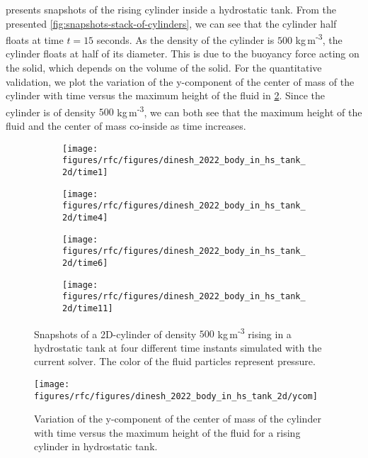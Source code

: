  presents snapshots of the rising
cylinder inside a hydrostatic tank. From the presented
\cref{fig:snapshots-stack-of-cylinders}, we can see that the cylinder half
floats at time $t = 15$ seconds. As the density of the cylinder is $500$
kg\,m\textsuperscript{-3}, the cylinder floats at half of its diameter. This is due
to the buoyancy force acting on the solid, which depends on the volume of the
solid. For the quantitative validation, we plot the variation of the y-component of
the center of mass of the cylinder with time versus the maximum height of the
fluid in \cref{fig:raising-falling-solid-in-water}. Since the cylinder is of
density $500$ kg\,m\textsuperscript{-3}, we can both see that the maximum height of the fluid
and the center of mass co-inside as time increases.
\begin{figure}[!htpb]
  \centering
  \begin{subfigure}{0.48\textwidth}
    \centering
    \texttt{[image: figures/rfc/figures/dinesh\_2022\_body\_in\_hs\_tank\_2d/time1]}
  \end{subfigure}
  \begin{subfigure}{0.48\textwidth}
    \centering
    \texttt{[image: figures/rfc/figures/dinesh\_2022\_body\_in\_hs\_tank\_2d/time4]}
  \end{subfigure}

  \begin{subfigure}{0.48\textwidth}
    \centering
    \texttt{[image: figures/rfc/figures/dinesh\_2022\_body\_in\_hs\_tank\_2d/time6]}
  \end{subfigure}
  \begin{subfigure}{0.48\textwidth}
    \centering
    \texttt{[image: figures/rfc/figures/dinesh\_2022\_body\_in\_hs\_tank\_2d/time11]}
  \end{subfigure}
  \caption{Snapshots of a 2D-cylinder of density $500$ kg\,m\textsuperscript{-3}
    rising in a hydrostatic tank at four different time instants simulated
    with the current solver. The color of the fluid particles represent pressure.}
\label{fig:snapshots-rising-solid-in-water}
\end{figure}
\begin{figure}[!htpb]
  \centering
  \texttt{[image: figures/rfc/figures/dinesh\_2022\_body\_in\_hs\_tank\_2d/ycom]}
  \caption{Variation of the y-component of the center of mass of the cylinder
    with time versus the maximum height of the fluid for a rising cylinder in
    hydrostatic tank.}
\label{fig:raising-falling-solid-in-water}
\end{figure}


